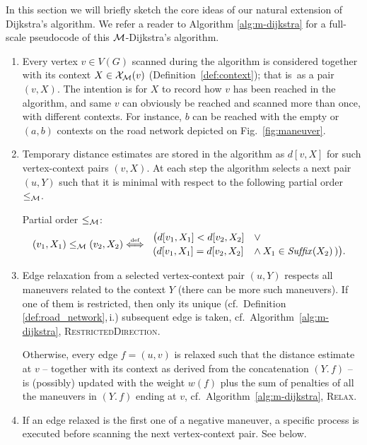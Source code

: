\documentclass[envcountsect,envcountsame]{llncs}
\begin{document}
In this section we will briefly sketch the core ideas of our natural extension 
of Dijkstra's algorithm. We refer a reader to Algorithm \ref{alg:m-dijkstra}
for a full-scale pseudocode of this $\cal{M}$-Dijkstra's algorithm.

\begin{enumerate}
\parskip 3pt
\item Every vertex $v\in V(G)$ scanned during the algorithm is considered 
  together with its context $X \in {\cal X}_{\cal M}(v)$ 
  (Definition~\ref{def:context}); that is\ as a pair $(v,X)$.
  The intention is for $X$ to record how $v$ has  been reached in the 
  algorithm, and same $v$ can obviously be reached and scanned more than 
  once, with different contexts.
  For instance, $b$ can be reached with the empty or $(a,b)$ contexts 
  on the road network depicted on Fig.~\ref{fig:maneuver}.

\item Temporary distance estimates are stored in the algorithm as $d[v,X]$
  for such vertex-context pairs $(v,X)$. At each step the 
  algorithm selects a next pair $(u,Y)$ such that it is minimal with respect 
  to the following partial order $\le_{\cal M}$.

  \begin{remark}{Partial order $\le_{\cal M}$:}
  \label{rmk:order}
  $$
  (v_1,X_1) \le_{\cal M} (v_2,X_2) 
  \stackrel{\textrm{\tiny{def}}}{\Longleftrightarrow}
  \left.\begin{array}{ll}\big(d[v_1,X_1] < d[v_2,X_2] &\lor\\[2pt] 
      (d[v_1,X_1] = d[v_2,X_2] &\land \> X_1 \in \mathit{Suf\!fix}(X_2)\,)\big).
    \end{array}\right.
  $$
  \end{remark}

\item Edge relaxation from a selected vertex-context pair $(u,Y)$ respects
  all maneuvers related to the context $Y$ (there can be more such maneuvers).
  If one of them is restricted, then only its unique (cf.\ Definition
  \ref{def:road_network},\,i.) subsequent edge is taken, cf.\ 
  Algorithm~\ref{alg:m-dijkstra}, \textsc{RestrictedDirection}.

  Otherwise, every edge $f=(u,v)$ is relaxed such that the distance estimate 
  at $v$ -- together with its context as derived from the concatenation 
  $(Y.\,f)$ -- is (possibly) updated with the weight $w(f)$ plus the sum of 
  penalties of all the maneuvers in $(Y.\,f)$ ending at $v$, 
  cf.~Algorithm~\ref{alg:m-dijkstra}, \textsc{Relax}.

\item If an edge relaxed is the first one of a negative maneuver,
  a specific process is executed before scanning the next vertex-context pair.
  See below.
\end{enumerate}
\end{document}
